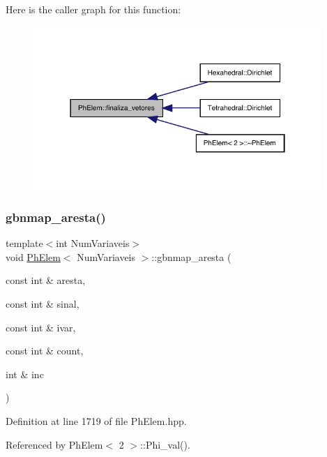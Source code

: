 Here is the caller graph for this function\+:
\nopagebreak
\begin{figure}[H]
\begin{center}
\leavevmode
\includegraphics[width=310pt]{classPhElem_aa7e0f33c0d15b74e1dae945e35626cc7_icgraph}
\end{center}
\end{figure}
\mbox{\label{classPhElem_a19299ae55f9faef322a1d21d7e9b2a88}} 
\subsubsection{\texorpdfstring{gbnmap\+\_\+aresta()}{gbnmap\_aresta()}}
{\footnotesize\ttfamily template$<$int Num\+Variaveis$>$ \\
void \hyperlink{classPhElem}{Ph\+Elem}$<$ Num\+Variaveis $>$\+::gbnmap\+\_\+aresta (\begin{DoxyParamCaption}\item[{const int \&}]{aresta,  }\item[{const int \&}]{sinal,  }\item[{const int \&}]{ivar,  }\item[{const int \&}]{count,  }\item[{int \&}]{inc }\end{DoxyParamCaption})}



Definition at line 1719 of file Ph\+Elem.\+hpp.



Referenced by Ph\+Elem$<$ 2 $>$\+::\+Phi\+\_\+val().

